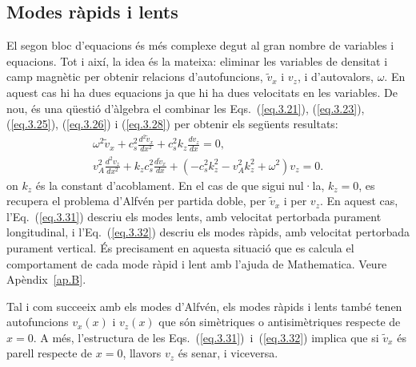 \subsection{Modes ràpids i lents} \label{subsubsec:ones_modes_r_i_l}
El segon bloc d'equacions és més complexe degut al gran nombre de variables i equacions.
Tot i així, la idea és la mateixa: eliminar les variables de densitat i camp magnètic per obtenir relacions d'autofuncions, $\tilde{v}_{x}$ i $v_{z}$, i d'autovalors, $\omega$.
En aquest cas hi ha dues equacions ja que hi ha dues velocitats en les variables. De nou, és una qüestió d'àlgebra el combinar les
Eqs.~(\ref{eq.3.21}), (\ref{eq.3.23}), (\ref{eq.3.25}), (\ref{eq.3.26}) i (\ref{eq.3.28}) per obtenir els següents resultats:
\begin{gather}
	\omega^2 \tilde{v}_{x} + c_s^2 \frac{d^2 \tilde{v}_{x}}{dx^2} + c_s^2 k_z \frac{d v_{z}}{dx} = 0, \tag{3.31} \label{eq.3.31} \\
	v_A^2 \frac{d^2 v_{z}}{dx^2} + k_z c_s^2 \frac{d \tilde{v}_{x}}{dx} + \left(-c_s^2 k_z^2 - v_A^2 k_z^2 + \omega^2 \right) v_{z} = 0. \tag{3.32} \label{eq.3.32}
\end{gather}
on $k_z$ és la constant d'acoblament. En el cas de que sigui nul·la, $k_z = 0$, es recupera el problema d'Alfvén per partida doble, per $\tilde{v}_{x}$ i per $v_z$.
En aquest cas, l'Eq.~(\ref{eq.3.31}) descriu els modes lents, amb velocitat pertorbada purament longitudinal, i l'Eq.~(\ref{eq.3.32}) descriu els modes ràpids, amb velocitat pertorbada purament vertical.
És precisament en aquesta situació que es calcula el comportament de cada mode ràpid i lent amb l'ajuda de Mathematica. Veure Apèndix~\ref{ap.B}.

Tal i com succeeix amb els modes d'Alfvén,
els modes ràpids i lents també tenen autofuncions $v_x(x)$ i $v_z(x)$ que són simètriques o antisimètriques respecte de $x=0$.
A més, l'estructura de les Eqs.~(\ref{eq.3.31})~i~(\ref{eq.3.32}) implica que si $\tilde{v}_{x}$ és parell respecte de $x = 0$, llavors $v_z$ és senar, i viceversa.





